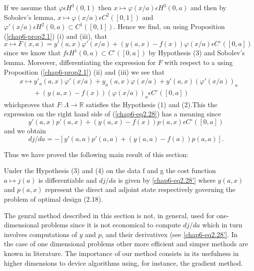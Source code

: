 If we assume that $\varphi \epsilon H^{3}(0, 1)$ then $x \mapsto
\varphi (x/a) \epsilon H^{3} (0, a)$ and then by Sobolev's lemma, $x
\mapsto \varphi(x/a) \epsilon C^{2} ([0, 1])$ and $\varphi'(x/a)
\epsilon H^{2} (0, a) \subset C^{1} ([0, 1])$. Hence we find, on using
Proposition (\ref{chap6-prop2.1}) (i) and (iii), that 
\begin{equation*}
x \mapsto F(x, a) = y'(a, x) \varphi'(x/a) + (y(a, x) - f(x)) \varphi(x/a) \epsilon C^{\circ} ([0, a])\tag{2.42}\label{chap6-eq2.42}
\end{equation*} 
since we know that $f \epsilon H^{1} (0, a) \subset C^{\circ} ([0,
  a])$ by Hypothesis (3) and Sobolev's lemma. Moreover,
differentiating the expression for $F$ with respect to a using
Proposition (\ref{chap6-prop2.1}) (ii) and (iii) we see that 
\begin{align*}
& x \mapsto y'_{a} (a, x) \varphi'(x/a) + y_{a} (a, x) \varphi(x/a) + y'(a, x) (\varphi'(x/a))_{a}\\
& \qquad  + (y(a, x) - f(x)) (\varphi(x/a))_{a} \epsilon C^{\circ} ([0, a])\tag{2.43}\label{chap6-eq2.43}
\end{align*}
which\pageoriginale proves that $F : \Lambda \to \mathbb{R}$ satisfies
the Hypothesis (1) and (2).This the expression on the right hand side
of (\ref{chap6-eq2.28}) has a meaning since 
\begin{equation*}
y'(a, x) p'(a, x) + (y(a, x) - f(x)) p(a, x) \epsilon C^{\circ} ([0, a])\tag{2.44}\label{chap6-eq2.44}
\end{equation*}
and we obtain
\begin{equation*}
dj/da = -[y'(a, a)p'(a, a) + (y(a, a) - f(a)) p(a, a)].\tag*{$(2.28)'$}\label{chap6-eq2.28'}
\end{equation*}

Thus we have proved the following main result of this section:
\begin{theorem}\label{chap6-thm2.1}
Under the Hypothesis (3) and (4) on the data f and g the cost function
$a \mapsto j(a)$ is differentiable and $dj/da$ is given by
\ref{chap6-eq2.28'} where $y(a, x)$ and $p(a, x)$ represent the direct
and adjoint state respectively governing the problem of optimal design
(2.18). 
\end{theorem}

\begin{remark}\label{chap6-rem2.4}
The genral method described in this section is not, in general, used
for one-dimensional problems since it is not economical to compute
$dj/da$ which in turn involves computations of $y$ and $p$, and their
derivativex (see \ref{chap6-eq2.28'}. In the case of one dimensional
problems other more efficient and simper methods are known in
literature. The importance of our method consists in its usefulness in
higher dimensions to device algorithms using, for instance, the
gradient method. 
\end{remark}



